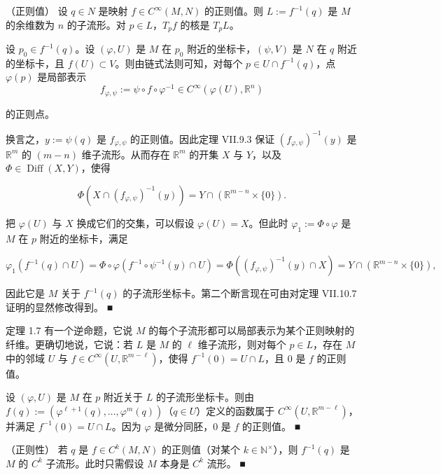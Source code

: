 \begin{theorem}

（正则值） 设 $ q \in N $ 是映射 $ f \in C^\infty(M, N) $ 的正则值。则 $ L := f^{-1}(q) $ 是 $ M $ 的余维数为 $ n $ 的子流形。对 $ p \in L $，$ T_p f $ 的核是 $ T_p L $。

\proofhead
设 $ p_0 \in f^{-1}(q) $。设 $ (\varphi, U) $ 是 $ M $ 在 $ p_0 $ 附近的坐标卡，$ (\psi, V) $ 是 $ N $ 在 $ q $ 附近的坐标卡，且 $ f(U) \subset V $。则由链式法则可知，对每个 $ p \in U \cap f^{-1}(q) $，点 $ \varphi(p) $ 是局部表示
\[
f_{\varphi,\psi} := \psi \circ f \circ \varphi^{-1} \in C^\infty(\varphi(U), \mathbb{R}^n)
\]

的正则点。

换言之，$ y := \psi(q) $ 是 $ f_{\varphi,\psi} $ 的正则值。因此定理 VII.9.3 保证 $ (f_{\varphi,\psi})^{-1}(y) $ 是 $ \mathbb{R}^m $ 的 $ (m-n) $ 维子流形。从而存在 $ \mathbb{R}^m $ 的开集 $ X $ 与 $ Y $，以及 $ \Phi \in \operatorname{Diff}(X, Y) $，使得

\[
\Phi(X \cap (f_{\varphi,\psi})^{-1}(y)) = Y \cap (\mathbb{R}^{m-n} \times \{0\}).
\]

把 $ \varphi(U) $ 与 $ X $ 换成它们的交集，可以假设 $ \varphi(U) = X $。但此时 $ \varphi_1 := \Phi \circ \varphi $ 是 $ M $ 在 $ p $ 附近的坐标卡，满足

\[
\varphi_1(f^{-1}(q) \cap U) = \Phi \circ \varphi(f^{-1} \circ \psi^{-1}(y) \cap U) = \Phi((f_{\varphi,\psi})^{-1}(y) \cap X) = Y \cap (\mathbb{R}^{m-n} \times \{0\}),
\]

因此它是 $ M $ 关于 $ f^{-1}(q) $ 的子流形坐标卡。第二个断言现在可由对定理 VII.10.7 证明的显然修改得到。 \nobreak\hspace{0.35em}■

\end{theorem}

\begin{remark}

\begin{items}
\item

定理 1.7 有一个逆命题，它说 $ M $ 的每个子流形都可以局部表示为某个正则映射的纤维。更确切地说，它说：若 $ L $ 是 $ M $ 的 $ \ell $ 维子流形，则对每个 $ p \in L $，存在 $ M $ 中的邻域 $ U $ 与 $ f \in C^\infty(U, \mathbb{R}^{m-\ell}) $，使得 $ f^{-1}(0) = U \cap L $，且 $ 0 $ 是 $ f $ 的正则值。

\proofhead
设 $ (\varphi, U) $ 是 $ M $ 在 $ p $ 附近关于 $ L $ 的子流形坐标卡。则由 $ f(q) := (\varphi^{\ell+1}(q), \ldots, \varphi^m(q)) $（$ q \in U $）定义的函数属于 $ C^\infty(U, \mathbb{R}^{m-\ell}) $，并满足 $ f^{-1}(0) = U \cap L $。因为 $ \varphi $ 是微分同胚，$ 0 $ 是 $ f $ 的正则值。 \nobreak\hspace{0.35em}■
\item

（正则性） 若 $ q $ 是 $ f \in C^k(M, N) $ 的正则值（对某个 $ k \in \mathbb{N}^\times $），则 $ f^{-1}(q) $ 是 $ M $ 的 $ C^k $ 子流形。此时只需假设 $ M $ 本身是 $ C^k $ 流形。 \nobreak\hspace{0.35em}■

\end{items}

\end{remark}

